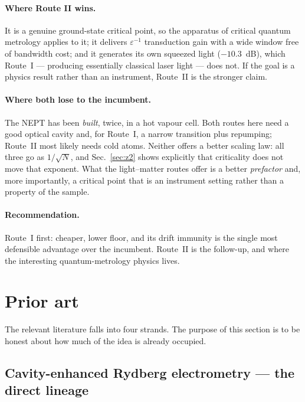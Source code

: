 \documentclass[11pt,a4paper]{article}
\begin{document}
\paragraph{Where Route II wins.} It is a genuine ground-state critical point, so the apparatus
of critical quantum metrology applies to it; it delivers $\varepsilon^{-1}$ transduction gain
with a wide window free of bandwidth cost; and it generates its own squeezed light
($-10.3$~dB), which Route~I --- producing essentially classical laser light --- does not. If
the goal is a physics result rather than an instrument, Route~II is the stronger claim.

\paragraph{Where both lose to the incumbent.} The NEPT has been \emph{built}, twice, in a hot
vapour cell. Both routes here need a good optical cavity and, for Route~I, a narrow transition
plus repumping; Route~II most likely needs cold atoms. Neither offers a better scaling law: all
three go as $1/\sqrt N$, and Sec.~\ref{sec:z2} shows explicitly that criticality does not move
that exponent. What the light--matter routes offer is a better \emph{prefactor} and, more
importantly, a critical point that is an instrument setting rather than a property of the
sample.

\paragraph{Recommendation.} Route~I first: cheaper, lower floor, and its drift immunity is the
single most defensible advantage over the incumbent. Route~II is the follow-up, and where the
interesting quantum-metrology physics lives.

\section{Prior art}
\label{sec:prior}

The relevant literature falls into four strands. The purpose of this section is to be
honest about how much of the idea is already occupied.

\subsection{Cavity-enhanced Rydberg electrometry --- the direct lineage}
\end{document}
